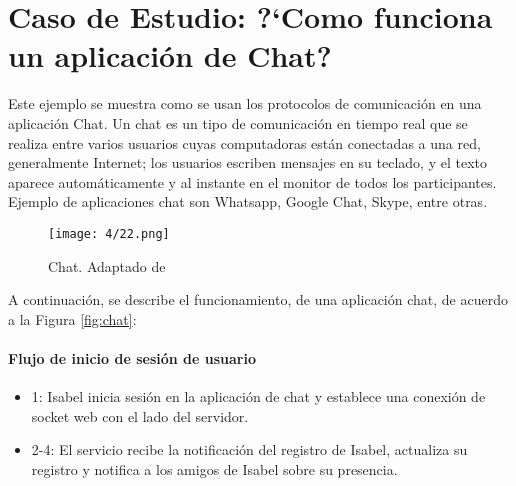 

\section{Caso de Estudio: ?`Como funciona un aplicación de Chat?}

Este ejemplo se muestra como se usan los protocolos de comunicación en una aplicación Chat.
Un chat es un tipo de comunicación en tiempo real que se realiza entre varios usuarios cuyas computadoras están conectadas a una red, generalmente Internet; los usuarios escriben mensajes en su teclado, y el texto aparece automáticamente y al instante en el monitor de todos los participantes.
Ejemplo de aplicaciones chat son Whatsapp, Google Chat, Skype, entre otras.

\begin{figure}  
	 \begin{center}
	\texttt{[image: 4/22.png]}
	\caption{Chat. Adaptado de \cite{Xu2022}}
\end{center}
  \end{figure}

A continuación, se describe el funcionamiento, de una aplicación chat, de acuerdo a la  Figura \ref{fig:chat}:

\paragraph{Flujo de inicio de sesión de usuario}

\begin{itemize}
	\item 1: Isabel inicia sesión en la aplicación de chat y establece una conexión de socket web con el lado del servidor.
	\item 2-4: El servicio  recibe  la notificación del registro de Isabel, actualiza su registro y notifica a los amigos de Isabel sobre su presencia.
\end{itemize}

